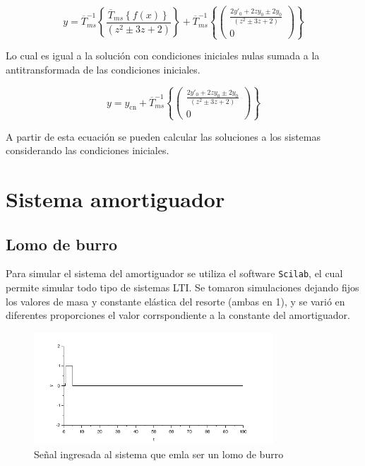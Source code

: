 \documentclass[12pt]{article}
\begin{document}
$$
y = \overline{T}_{ms}^{-1}\left\{\frac{\overline{T}_{ms}\left\{f(x)\right\} }{(z^2 \pm 3z +2)}\right\}
+\overline{T}_{ms}^{-1}\left\{\begin{pmatrix}
\frac{2y'_0 + 2z y_0 \pm 2y_0}{(z^2 \pm 3z +2)} \\[0.3 cm]
0
\end{pmatrix}\right\}
$$

Lo cual es igual a la solución con condiciones iniciales nulas sumada a la antitransformada de las condiciones iniciales.

$$
y = y_{\textrm{cn}}
+\overline{T}_{ms}^{-1}\left\{\begin{pmatrix}
\frac{2y'_0 + 2z y_0 \pm 2y_0}{(z^2 \pm 3z +2)} \\[0.3 cm]
0
\end{pmatrix}\right\}
$$

A partir de esta ecuación se pueden calcular las soluciones a los sistemas considerando las condiciones iniciales.


\section{Sistema amortiguador}

\subsection{Lomo de burro}

Para simular el sistema del amortiguador se utiliza el software \texttt{Scilab}, el cual permite simular todo tipo de sistemas LTI.
Se tomaron simulaciones dejando fijos los valores de masa y constante elástica del resorte (ambas en 1), y se varió en diferentes proporciones el valor corrspondiente a la constante del amortiguador.

\begin{figure}[h!]
\center
\includegraphics[width=0.8\textwidth]{amortiguador_entrada.PNG}
\caption{Señal ingresada al sistema que emla ser un lomo de burro}
\label{entrada}
\end{figure}
\end{document}
